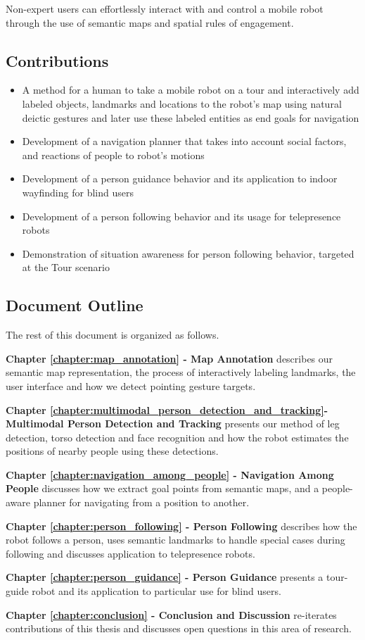 Non-expert users can effortlessly interact with and control a mobile robot through the use of semantic maps and spatial rules of engagement.

\subsection{Contributions}

\begin{itemize}
\item A method for a human to take a mobile robot on a tour and interactively add labeled objects, landmarks and locations to the robot's map using natural deictic gestures and later use these labeled entities as end goals for navigation
\item Development of a navigation planner that takes into account social factors, and reactions of people to robot's motions
\item Development of a person guidance behavior and its application to indoor wayfinding for blind users
\item Development of a person following behavior and its usage for telepresence robots
\item Demonstration of situation awareness for person following behavior, targeted at the Tour scenario
\end{itemize}


\subsection{Document Outline}

The rest of this document is organized as follows.

\textbf{Chapter \ref{chapter:map_annotation} - Map Annotation} describes our semantic map representation, the process of interactively labeling landmarks, the user interface and how we detect pointing gesture targets.

\textbf{Chapter \ref{chapter:multimodal_person_detection_and_tracking}- Multimodal Person Detection and Tracking} presents our method of leg detection, torso detection and face recognition and how the robot estimates the positions of nearby people using these detections.

\textbf{Chapter \ref{chapter:navigation_among_people} - Navigation Among People} discusses how we extract goal points from semantic maps, and a people-aware planner for navigating from a position to another.

\textbf{Chapter \ref{chapter:person_following} - Person Following} describes how the robot follows a person, uses semantic landmarks to handle special cases during following and discusses application to telepresence robots.

\textbf{Chapter \ref{chapter:person_guidance} - Person Guidance} presents a tour-guide robot and its application to particular use for blind users.

\textbf{Chapter \ref{chapter:conclusion} - Conclusion and Discussion} re-iterates contributions of this thesis and discusses open questions in this area of research.
